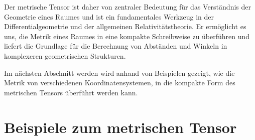 Der metrische Tensor ist daher von zentraler Bedeutung für das Verständnis der Geometrie eines Raumes und ist ein fundamentales Werkzeug in der Differentialgeometrie und der allgemeinen Relativitätstheorie. 
Er ermöglicht es uns, die Metrik eines Raumes in eine kompakte Schreibweise zu überführen und liefert die Grundlage für die Berechnung von Abständen und Winkeln in komplexeren geometrischen Strukturen.

Im nächsten Abschnitt werden wird anhand von Beispielen gezeigt, wie die Metrik von verschiedenen Koordinatensystemen, in die kompakte Form des metrischen Tensors überführt werden kann.

\section{Beispiele zum metrischen Tensor}




